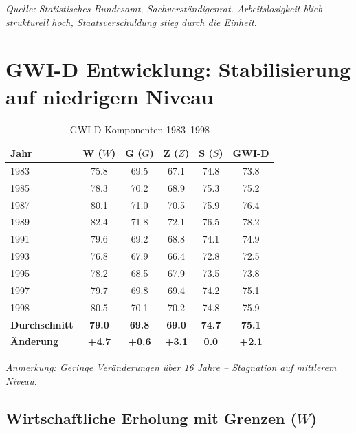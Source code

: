 \begin{flushleft}
\footnotesize{\textit{Quelle: Statistisches Bundesamt, Sachverständigenrat. Arbeitslosigkeit blieb strukturell hoch, Staatsverschuldung stieg durch die Einheit.}}
\end{flushleft}

\section{GWI-D Entwicklung: Stabilisierung auf niedrigem Niveau}

\begin{table}[ht]
    \centering
    \caption{GWI-D Komponenten 1983–1998}
    \label{tab:gwi_konsolidierung}
    \begin{tabular}{lccccc}
        \toprule
        \textbf{Jahr} & \textbf{W (\(W\))} & \textbf{G (\(G\))} & \textbf{Z (\(Z\))} & \textbf{S (\(S\))} & \textbf{GWI-D} \\
        \midrule
        1983 & 75.8 & 69.5 & 67.1 & 74.8 & 73.8 \\
        1985 & 78.3 & 70.2 & 68.9 & 75.3 & 75.2 \\
        1987 & 80.1 & 71.0 & 70.5 & 75.9 & 76.4 \\
        1989 & 82.4 & 71.8 & 72.1 & 76.5 & 78.2 \\
        1991 & 79.6 & 69.2 & 68.8 & 74.1 & 74.9 \\
        1993 & 76.8 & 67.9 & 66.4 & 72.8 & 72.5 \\
        1995 & 78.2 & 68.5 & 67.9 & 73.5 & 73.8 \\
        1997 & 79.7 & 69.8 & 69.4 & 74.2 & 75.1 \\
        1998 & 80.5 & 70.1 & 70.2 & 74.8 & 75.9 \\
        \midrule
        \textbf{Durchschnitt} & \textbf{79.0} & \textbf{69.8} & \textbf{69.0} & \textbf{74.7} & \textbf{75.1} \\
        \textbf{Änderung} & \textbf{+4.7} & \textbf{+0.6} & \textbf{+3.1} & \textbf{0.0} & \textbf{+2.1} \\
        \bottomrule
    \end{tabular}
\end{table}

\begin{flushleft}
\footnotesize{\textit{Anmerkung: Geringe Veränderungen über 16 Jahre – Stagnation auf mittlerem Niveau.}}
\end{flushleft}

\subsection{Wirtschaftliche Erholung mit Grenzen (\(W\))}

